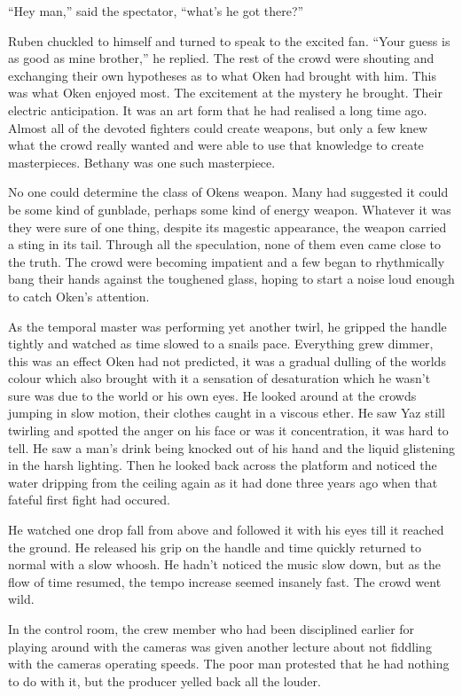 ``Hey man,'' said the spectator, ``what's he got there?''

Ruben chuckled to himself and turned to speak to the excited fan. ``Your guess is as good as mine brother,'' he replied. The rest of the crowd were shouting and exchanging their own hypotheses as to what Oken had brought with him. This was what Oken enjoyed most. The excitement at the mystery he brought. Their electric anticipation. It was an art form that he had realised a long time ago. Almost all of the devoted fighters could create weapons, but only a few knew what the crowd really wanted and were able to use that knowledge to create masterpieces. Bethany was one such masterpiece.

No one could determine the class of Okens weapon. Many had suggested it could be some kind of gunblade, perhaps some kind of energy weapon. Whatever it was they were sure of one thing, despite its magestic appearance, the weapon carried a sting in its tail. Through all the speculation, none of them even came close to the truth. The crowd were becoming impatient and a few began to rhythmically bang their hands against the toughened glass, hoping to start a noise loud enough to catch Oken's attention.

As the temporal master was performing yet another twirl, he gripped the handle tightly and watched as time slowed to a snails pace. Everything grew dimmer, this was an effect Oken had not predicted, it was a gradual dulling of the worlds colour which also brought with it a sensation of desaturation which he wasn't sure was due to the world or his own eyes. He looked around at the crowds jumping in slow motion, their clothes caught in a viscous ether. He saw Yaz still twirling and spotted the anger on his face or was it concentration, it was hard to tell. He saw a man's drink being knocked out of his hand and the liquid glistening in the harsh lighting. Then he looked back across the platform and noticed the water dripping from the ceiling again as it had done three years ago when that fateful first fight had occured.

He watched one drop fall from above and followed it with his eyes till it reached the ground. He released his grip on the handle and time quickly returned to normal with a slow whoosh. He hadn't noticed the music slow down, but as the flow of time resumed, the tempo increase seemed insanely fast. The crowd went wild.

In the control room, the crew member who had been disciplined earlier for playing around with the cameras was given another lecture about not fiddling with the cameras operating speeds. The poor man protested that he had nothing to do with it, but the producer yelled back all the louder.

